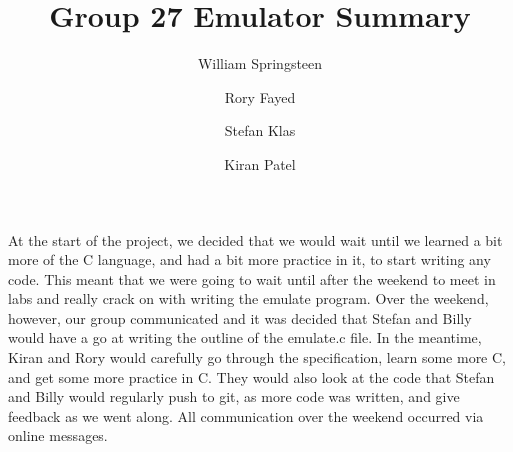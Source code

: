 \documentclass[a4wide, 10pt]{article}
\begin{document}
\title{Group 27 Emulator Summary}

\author{William Springsteen \and Rory Fayed \and Stefan Klas \and Kiran Patel}

\maketitle

At the start of the project, we decided that we would wait until we learned a bit more
 of the C language, and had a bit more practice in it, to start writing any code. This
  meant that we were going to wait until after the weekend to meet in labs and really
   crack on with writing the emulate program. Over the weekend, however, our group
    communicated and it was decided that Stefan and Billy would have a go at writing
     the outline of the emulate.c file. In the meantime, Kiran and Rory would carefully
      go through the specification, learn some more C, and get some more practice in C.
       They would also look at the code that Stefan and Billy would regularly push to
        git, as more code was written, and give feedback as we went along. All
         communication over the weekend occurred via online messages.
\end{document}
